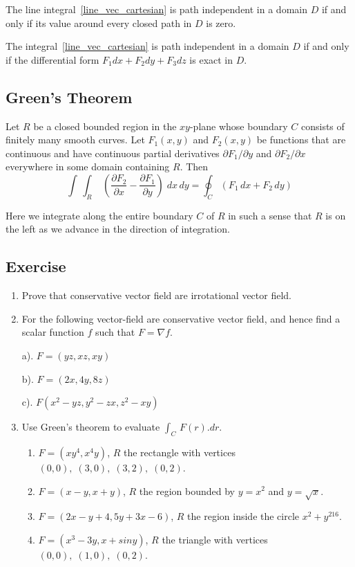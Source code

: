 \documentclass[aima331_lecturenotes_ku.tex]{subfiles}
\begin{document}
\begin{theorem}
  The line integral~\ref{line_vec_cartesian} is path independent in a domain $D$ if and only if its value around every closed path in $D$ is zero.
\end{theorem}

\begin{theorem}
  The integral~\ref{line_vec_cartesian} is path independent in a domain $D$ if and only if the differential form $F_1dx + F_2dy + F_3dz$ is exact in $D$.
\end{theorem}

\subsection{Green's Theorem}
\begin{mdframed}
  Let $R$ be a closed bounded region in the $xy$-plane whose boundary $C$ consists of finitely many smooth curves. Let $F_1(x,y)$ and $F_2(x,y)$ be functions that are continuous and have continuous partial derivatives $\partial F_1 /\partial y$ and $\partial F_2 /\partial x$ everywhere in some domain containing $R$. Then
  \begin{equation}
    \label{green}
    \int \, \int _R \; \left ( \frac{\partial F_2}{\partial x} - \frac{\partial F_1}{\partial y}  \right )\;dx\,dy = \oint_C (F_1\,dx + F_2 \, dy)
  \end{equation}
\end{mdframed}
Here we integrate along the entire boundary $C$ of $R$ in such a sense that $R$ is on the left as we advance in the direction of integration.

\subsection{Exercise}
\begin{enumerate}
\item Prove that conservative vector field are irrotational vector field.
\item For the following vector-field are conservative vector field, and hence find a scalar function $f$ such that $F=\nabla f$.
  \begin{multicols}{3}
    a). $F=(yz,xz,xy)$
    \columnbreak

    b). $F=(2x,4y,8z)$
    \columnbreak

    c). $F(x^2-yz, y^2-zx, z^2-xy)$

  \end{multicols}
\item Use Green's theorem to evaluate $\int_C\, F(r).dr$.
  \begin{enumerate}
  \item $F=(xy^4,x^4y)$, $R$ the rectangle with vertices $(0,0), \; (3,0), \; (3,2), \; (0,2)$.
  \item $F=(x-y,x+y)$, $R$ the region bounded by $y=x^2$ and $y=\sqrt{x}$.
  \item $F=(2x-y+4,5y+3x-6)$, $R$ the region inside the circle $x^2+y^216$.
   \item $F=(x^3-3y,x+siny)$, $R$ the triangle with vertices $(0,0), \; (1,0), \; (0,2)$.
  \end{enumerate}
\end{enumerate}
\end{document}
